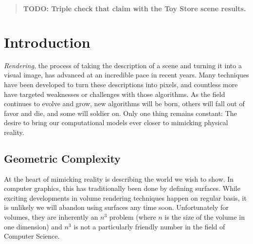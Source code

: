 \documentclass[12pt]{ucthesis}
\begin{document}
\begin{frontmatter}
\begin{abstract}
\textbf{TODO: Triple check that claim with the Toy Store scene results.}

\end{abstract}





\tableofcontents


\listoftables

\listoffigures

\end{frontmatter}

\pagestyle{plain}




\renewcommand{\baselinestretch}{1.66}







\chapter{Introduction}
\label{intro}

\emph{Rendering}, the process of taking the description of a scene and turning
it into a visual image, has advanced at an incredible pace in recent
years. Many techniques have been developed to turn these descriptions into
pixels, and countless more have targeted weaknesses or challenges with those
algorithms. As the field continues to evolve and grow, new algorithms will be
born, others will fall out of favor and die, and some will soldier on. Only
one thing remains constant: The desire to bring our computational models ever
closer to mimicking physical reality.

\section{Geometric Complexity}
\label{complexity}

At the heart of mimicking reality is describing the world we wish to show. In
computer graphics, this has traditionally been done by defining surfaces. While
exciting developments in volume rendering techniques happen on regular basis,
it is unlikely we will abandon using surfaces any time soon. Unfortunately for
volumes, they are inherently an $n^3$ problem (where $n$ is the size of the
volume in one dimension) and $n^3$ is not a particularly friendly number in the
field of Computer Science.
\end{document}
